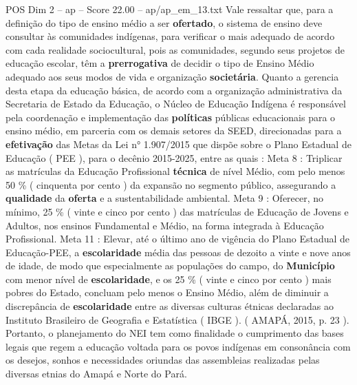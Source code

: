 \begin{textsample}{POS Dim 2 – ap – Score 22.00 – ap/ap\_em\_13.txt}
Vale ressaltar que, para a definição do tipo de ensino médio a ser \textbf{ofertado}, o sistema de ensino deve consultar às comunidades indígenas, para verificar o mais adequado de acordo com cada realidade sociocultural, pois as comunidades, segundo seus projetos de educação escolar, têm a \textbf{prerrogativa} de decidir o tipo de Ensino Médio adequado aos seus modos de vida e organização \textbf{societária}.
Quanto a gerencia desta etapa da educação básica, de acordo com a organização administrativa da Secretaria de Estado da Educação, o Núcleo de Educação Indígena é responsável pela coordenação e implementação das \textbf{políticas} públicas educacionais para o ensino médio, em parceria com os demais setores da SEED, direcionadas para a \textbf{efetivação} das Metas da Lei n{\EmojiFont °} 1.907/2015 que dispõe sobre o Plano Estadual de Educação ( PEE ), para o decênio 2015-2025, entre as quais : Meta 8 : Triplicar as matrículas da Educação Profissional \textbf{técnica} de nível Médio, com pelo menos 50 \% ( cinquenta por cento ) da expansão no segmento público, assegurando a \textbf{qualidade} da \textbf{oferta} e a sustentabilidade ambiental.
Meta 9 : Oferecer, no mínimo, 25 \% ( vinte e cinco por cento ) das matrículas de Educação de Jovens e Adultos, nos ensinos Fundamental e Médio, na forma integrada à Educação Profissional.
Meta 11 : Elevar, até o último ano de vigência do Plano Estadual de Educação-PEE, a \textbf{escolaridade} média das pessoas de dezoito a vinte e nove anos de idade, de modo que especialmente as populações do campo, do \textbf{Município} com menor nível de \textbf{escolaridade}, e os 25 \% ( vinte e cinco por cento ) mais pobres do Estado, concluam pelo menos o Ensino Médio, além de diminuir a discrepância de \textbf{escolaridade} entre as diversas culturas étnicas declaradas ao Instituto Brasileiro de Geografia e Estatística ( IBGE ). ( AMAPÁ, 2015, p. 23 ).
Portanto, o planejamento do NEI tem como finalidade o cumprimento das bases legais que regem a educação voltada para os povos indígenas em consonância com os desejos, sonhos e necessidades oriundas das assembleias realizadas pelas diversas etnias do Amapá e Norte do Pará.

\end{textsample}
